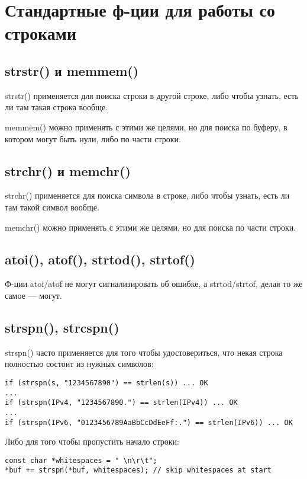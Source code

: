 ﻿\section{Стандартные ф-ции для работы со строками}

\subsection{strstr() и memmem()}

strstr() применяется для поиска строки в другой строке, либо чтобы узнать, есть ли там такая строка вообще.

memmem() можно применять с этими же целями, но для поиска по буферу, в котором могут быть нули,
либо по части строки.

\label{memchr}
\subsection{strchr() и memchr()}

strchr() применяется для поиска символа в строке, либо чтобы узнать, есть ли там такой символ вообще.

memchr() можно применять с этими же целями, но для поиска по части строки.

\subsection{atoi(), atof(), strtod(), strtof()}

Ф-ции atoi/atof не могут сигнализировать об ошибке, а strtod/strtof, делая то же самое --- могут.



\subsection{strspn(), strcspn()}

strspn() часто применяется для того чтобы удостовериться, что некая строка полностью состоит из
нужных символов:
    
\begin{lstlisting}
if (strspn(s, "1234567890") == strlen(s)) ... OK
...
if (strspn(IPv4, "1234567890.") == strlen(IPv4)) ... OK
...
if (strspn(IPv6, "0123456789AaBbCcDdEeFf:.") == strlen(IPv6)) ... OK
\end{lstlisting}

Либо для того чтобы пропустить начало строки:

\begin{lstlisting}
const char *whitespaces = " \n\r\t";
*buf += strspn(*buf, whitespaces); // skip whitespaces at start
\end{lstlisting}

